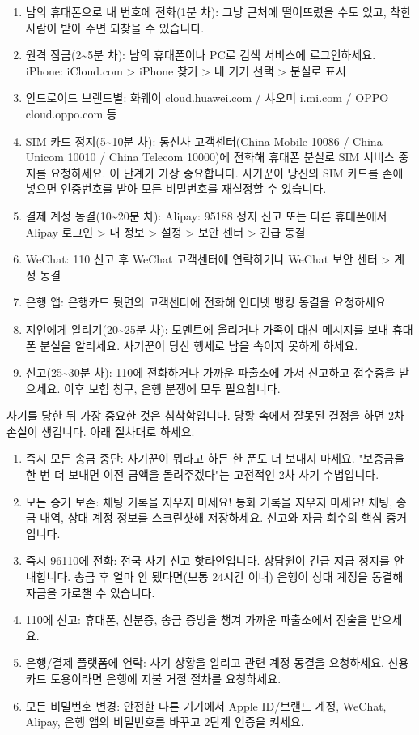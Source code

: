 \begin{enumerate}
  \item 남의 휴대폰으로 내 번호에 전화(1분 차): 그냥 근처에 떨어뜨렸을 수도 있고, 착한 사람이 받아 주면 되찾을 수 있습니다.
  \item 원격 잠금(2\textasciitilde{}5분 차): 남의 휴대폰이나 PC로 검색 서비스에 로그인하세요. iPhone: iCloud.com > iPhone 찾기 > 내 기기 선택 > 분실로 표시
  \item 안드로이드 브랜드별: 화웨이 cloud.huawei.com / 샤오미 i.mi.com / OPPO cloud.oppo.com 등
  \item SIM 카드 정지(5\textasciitilde{}10분 차): 통신사 고객센터(China Mobile 10086 / China Unicom 10010 / China Telecom 10000)에 전화해 휴대폰 분실로 SIM 서비스 중지를 요청하세요. 이 단계가 가장 중요합니다. 사기꾼이 당신의 SIM 카드를 손에 넣으면 인증번호를 받아 모든 비밀번호를 재설정할 수 있습니다.
  \item 결제 계정 동결(10\textasciitilde{}20분 차): Alipay: 95188 정지 신고 또는 다른 휴대폰에서 Alipay 로그인 > 내 정보 > 설정 > 보안 센터 > 긴급 동결
  \item WeChat: 110 신고 후 WeChat 고객센터에 연락하거나 WeChat 보안 센터 > 계정 동결
  \item 은행 앱: 은행카드 뒷면의 고객센터에 전화해 인터넷 뱅킹 동결을 요청하세요
  \item 지인에게 알리기(20\textasciitilde{}25분 차): 모멘트에 올리거나 가족이 대신 메시지를 보내 휴대폰 분실을 알리세요. 사기꾼이 당신 행세로 남을 속이지 못하게 하세요.
  \item 신고(25\textasciitilde{}30분 차): 110에 전화하거나 가까운 파출소에 가서 신고하고 접수증을 받으세요. 이후 보험 청구, 은행 분쟁에 모두 필요합니다.
\end{enumerate}


사기를 당한 뒤 가장 중요한 것은 침착함입니다. 당황 속에서 잘못된 결정을 하면 2차 손실이 생깁니다. 아래 절차대로 하세요.

\begin{enumerate}
  \item 즉시 모든 송금 중단: 사기꾼이 뭐라고 하든 한 푼도 더 보내지 마세요. "보증금을 한 번 더 보내면 이전 금액을 돌려주겠다"는 고전적인 2차 사기 수법입니다.
  \item 모든 증거 보존: 채팅 기록을 지우지 마세요! 통화 기록을 지우지 마세요! 채팅, 송금 내역, 상대 계정 정보를 스크린샷해 저장하세요. 신고와 자금 회수의 핵심 증거입니다.
  \item 즉시 96110에 전화: 전국 사기 신고 핫라인입니다. 상담원이 긴급 지급 정지를 안내합니다. 송금 후 얼마 안 됐다면(보통 24시간 이내) 은행이 상대 계정을 동결해 자금을 가로챌 수 있습니다.
  \item 110에 신고: 휴대폰, 신분증, 송금 증빙을 챙겨 가까운 파출소에서 진술을 받으세요.
  \item 은행/결제 플랫폼에 연락: 사기 상황을 알리고 관련 계정 동결을 요청하세요. 신용카드 도용이라면 은행에 지불 거절 절차를 요청하세요.
  \item 모든 비밀번호 변경: 안전한 다른 기기에서 Apple ID/브랜드 계정, WeChat, Alipay, 은행 앱의 비밀번호를 바꾸고 2단계 인증을 켜세요.
\end{enumerate}

